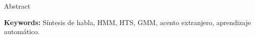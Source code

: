 \chapter*{\runtitle}

Abstract

\bigskip

\noindent\textbf{Keywords:} Síntesis de habla, HMM, HTS, GMM, acento extranjero, aprendizaje automático.